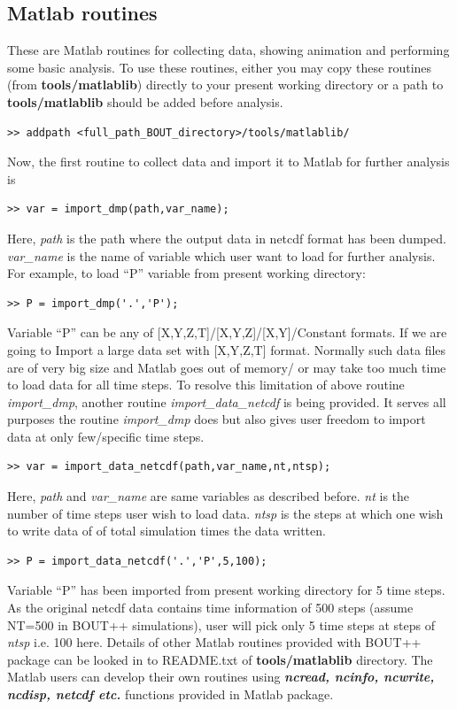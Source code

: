 \documentclass[12pt]{article}
\begin{document}
\subsection{Matlab routines}
%
\label{sec:matlabroutines}
%
These are Matlab routines for collecting data, showing animation and performing
some basic analysis.  To use these routines, either you may copy these routines
(from {\bf tools/matlablib}) directly to your present working directory or a
path to {\bf tools/matlablib} should be added before analysis.
%
\begin{verbatim}
>> addpath <full_path_BOUT_directory>/tools/matlablib/
\end{verbatim}
%
Now, the first routine to collect data and import it to Matlab for further
analysis is
%
\begin{verbatim}
>> var = import_dmp(path,var_name);
\end{verbatim}
%
Here, {\it path} is the path where the output data in netcdf format has been
dumped. {\it var\_name} is the name of variable which user want to load for
further analysis. For example, to load ``P'' variable from present working
directory:
%
\begin{verbatim}
>> P = import_dmp('.','P');
\end{verbatim}
%
Variable ``P'' can be any of [X,Y,Z,T]/[X,Y,Z]/[X,Y]/Constant formats.
%
If we are going to Import a large data set with [X,Y,Z,T] format. Normally such
data files are of very big size and Matlab goes out of memory/ or may take too
much time to load data for all time steps. To resolve this limitation of above
routine {\it import\_dmp}, another routine {\it import\_data\_netcdf} is being
provided. It serves all purposes the routine {\it import\_dmp} does but also
gives user freedom to import data at only few/specific time steps.
%
\begin{verbatim}
>> var = import_data_netcdf(path,var_name,nt,ntsp);
\end{verbatim}
%
Here, {\it path} and {\it var\_name} are same variables as described before.
{\it nt} is the number of time steps user wish to load data.  {\it ntsp} is the
steps at which one wish to write data of of total simulation times the data
written.
%
\begin{verbatim}
>> P = import_data_netcdf('.','P',5,100);
\end{verbatim}
%
Variable ``P'' has been imported from present working directory for 5 time
steps. As the original netcdf data contains time information of 500 steps
(assume NT=500 in BOUT++ simulations), user will pick only 5 time steps at
steps of {\it ntsp} i.e. 100 here.
%
Details of other Matlab routines provided with BOUT++ package can be looked in
to README.txt of {\bf tools/matlablib} directory.  The Matlab users can develop
their own routines using {\bf \it ncread, ncinfo, ncwrite, ncdisp, netcdf etc.}
functions provided in Matlab package.
\end{document}
